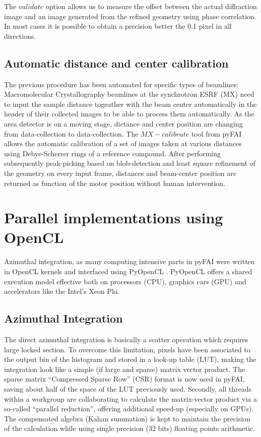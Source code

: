 \documentclass[preprint]{iucr}
\begin{document}
The $validate$ option allows us to measure the offset between the actual
diffraction image and an image generated from the refined geometry using phase
correlation. In most cases it is possible to obtain a precision better the 0.1
pixel in all directions.

\subsection{Automatic distance and center calibration}
The previous procedure has been automated for specific types of beamlines: 
Macromolecular Crystallography beamlines at the synchrotron ESRF (MX) need to
input the sample distance togeather with the beam center automatically in the header of
their collected images to be able to process them automatically.
As the area detector is on a moving stage, dictance and center position are
changing from data-collection to data-collection.
The $MX-calibrate$ tool from pyFAI allows the automatic calibration of
a set of images taken at various distances using Debye-Scherrer rings of a
reference compound.
After performing subsequently peak-picking based on blob-detection and least
square refinement of the geometry on every input frame, distances and
beam-center position are returned as function of the motor position without
human intervention.

\section{Parallel implementations using OpenCL}
Azimuthal integration, as  many computing intensive parts in pyFAI were written
in OpenCL kernels and interfaced using PyOpenCL \cite{pyopencl}. PyOpenCL offers a
shared execution model effective both on processors (CPU), graphics cars (GPU)
and accelerators like the Intel's Xeon Phi.

\subsection{Azimuthal Integration}
The direct azimuthal integration is basically a scatter operation which
requires large locked section.
To overcome this limitation, pixels have been
associated to the output bin of the histogram and stored in a look-up
table (LUT), making the integration look like a simple (if large and sparse)
matrix vector product.
The sparse matrix ``Compressed Sparse Row'' (CSR) format is now used in pyFAI,
saving about half of the space of the LUT previously used.
Secondly, all threads within a workgroup are collaborating to calculate the
matrix-vector product via a so-called ``parallel reduction'', offering
additional speed-up (especially on GPUs).
The compensated algebra (Kahan summation) is kept to maintain the precision
of the calculation while using single precision (32 bits) floating points
arithmetic. 
\end{document}
